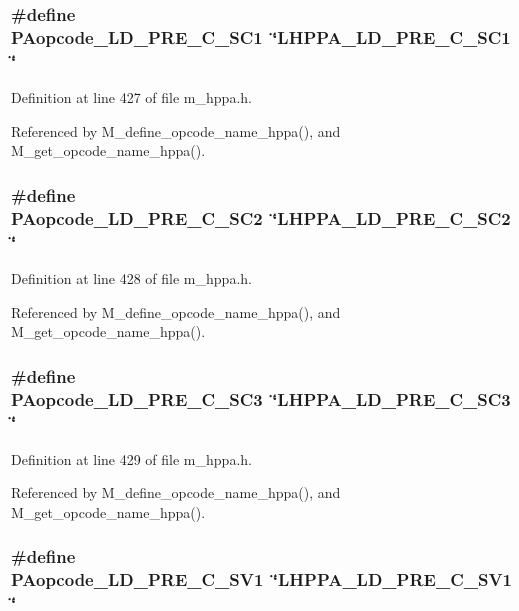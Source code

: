 \subsubsection{\setlength{\rightskip}{0pt plus 5cm}\#define PAopcode\_\-LD\_\-PRE\_\-C\_\-SC1~\char`\"{}LHPPA\_\-LD\_\-PRE\_\-C\_\-SC1\char`\"{}}\label{m__hppa_8h_fbea0b293a99dd2b883fa72c95e2676f}




Definition at line 427 of file m\_\-hppa.h.

Referenced by M\_\-define\_\-opcode\_\-name\_\-hppa(), and M\_\-get\_\-opcode\_\-name\_\-hppa().
\subsubsection{\setlength{\rightskip}{0pt plus 5cm}\#define PAopcode\_\-LD\_\-PRE\_\-C\_\-SC2~\char`\"{}LHPPA\_\-LD\_\-PRE\_\-C\_\-SC2\char`\"{}}\label{m__hppa_8h_efaf786762bfb33f479fb48cfed14d28}




Definition at line 428 of file m\_\-hppa.h.

Referenced by M\_\-define\_\-opcode\_\-name\_\-hppa(), and M\_\-get\_\-opcode\_\-name\_\-hppa().
\subsubsection{\setlength{\rightskip}{0pt plus 5cm}\#define PAopcode\_\-LD\_\-PRE\_\-C\_\-SC3~\char`\"{}LHPPA\_\-LD\_\-PRE\_\-C\_\-SC3\char`\"{}}\label{m__hppa_8h_857ffd5205fd6a14cdd8ff3bf5a9efa1}




Definition at line 429 of file m\_\-hppa.h.

Referenced by M\_\-define\_\-opcode\_\-name\_\-hppa(), and M\_\-get\_\-opcode\_\-name\_\-hppa().
\subsubsection{\setlength{\rightskip}{0pt plus 5cm}\#define PAopcode\_\-LD\_\-PRE\_\-C\_\-SV1~\char`\"{}LHPPA\_\-LD\_\-PRE\_\-C\_\-SV1\char`\"{}}\label{m__hppa_8h_b945d8fb65bb6fac1a2a048eb8f54db5}





